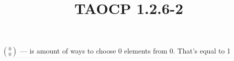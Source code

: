 \documentclass{article}
\title{TAOCP 1.2.6\mbox{-}2}
\begin{document}
\maketitle

\( \binom{0}{0} \) --- is amount of ways to choose 0 elements from 0. That's equal to 1
\end{document}
